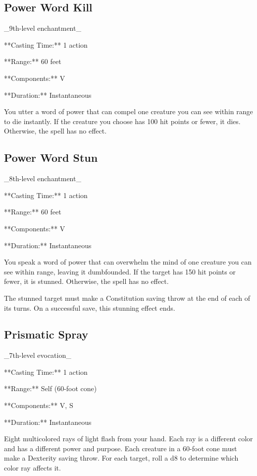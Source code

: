 \subsection{Power Word Kill}

_9th-level enchantment_

**Casting Time:** 1 action

**Range:** 60 feet

**Components:** V

**Duration:** Instantaneous

You utter a word of power that can compel one creature you can see within range to die instantly. If the creature you choose has 100 hit points or fewer, it dies. Otherwise, the spell has no effect.

\subsection{Power Word Stun}

_8th-level enchantment_

**Casting Time:** 1 action

**Range:** 60 feet

**Components:** V

**Duration:** Instantaneous

You speak a word of power that can overwhelm the mind of one creature you can see within range, leaving it dumbfounded. If the target has 150 hit points or fewer, it is stunned. Otherwise, the spell has no effect.

The stunned target must make a Constitution saving throw at the end of each of its turns. On a successful save, this stunning effect ends.

\subsection{Prismatic Spray}

_7th-level evocation_

**Casting Time:** 1 action

**Range:** Self (60-foot cone)

**Components:** V, S

**Duration:** Instantaneous

Eight multicolored rays of light flash from your hand. Each ray is a different color and has a different power and purpose. Each creature in a 60-foot cone must make a Dexterity saving throw. For each target, roll a d8 to determine which color ray affects it.

